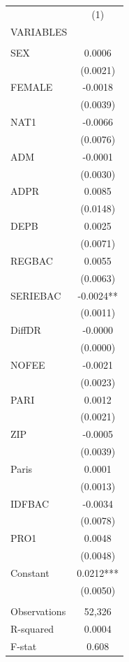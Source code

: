 \documentclass[]{article}
\begin{document}
\begin{tabular}{lc} \hline
 & (1) \\
VARIABLES &  \\ \hline
 &  \\
SEX & 0.0006 \\
 & (0.0021) \\
FEMALE & -0.0018 \\
 & (0.0039) \\
NAT1 & -0.0066 \\
 & (0.0076) \\
ADM & -0.0001 \\
 & (0.0030) \\
ADPR & 0.0085 \\
 & (0.0148) \\
DEPB & 0.0025 \\
 & (0.0071) \\
REGBAC & 0.0055 \\
 & (0.0063) \\
SERIEBAC & -0.0024** \\
 & (0.0011) \\
DiffDR & -0.0000 \\
 & (0.0000) \\
NOFEE & -0.0021 \\
 & (0.0023) \\
PARI & 0.0012 \\
 & (0.0021) \\
ZIP & -0.0005 \\
 & (0.0039) \\
Paris & 0.0001 \\
 & (0.0013) \\
IDFBAC & -0.0034 \\
 & (0.0078) \\
PRO1 & 0.0048 \\
 & (0.0048) \\
Constant & 0.0212*** \\
 & (0.0050) \\
 &  \\
Observations & 52,326 \\
R-squared & 0.0004 \\
 F-stat & 0.608 \\ \hline
\end{tabular}
\end{document}
